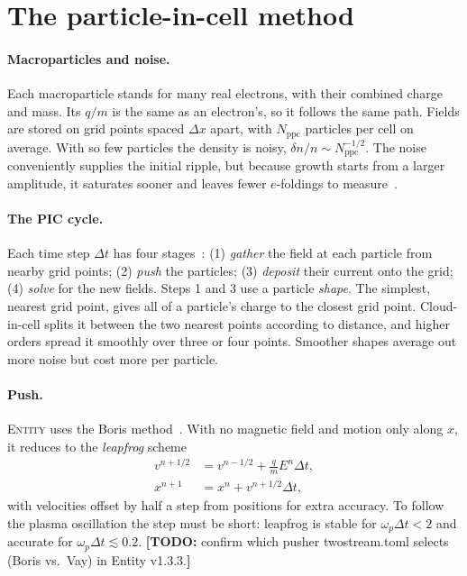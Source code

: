 \documentclass[10pt,twocolumn,letterpaper]{article}
\newcommand{\wpe}{\omega_{p}}         %
\newcommand{\ppc}{N_\mathrm{ppc}}     %
\newif\ifdraft \drafttrue
\newcommand{\todo}[1]{\ifdraft{\color{red}\textbf{[TODO:} #1\textbf{]}}\fi}
\begin{document}
\section{The particle-in-cell method}
\label{sec:pic}

\paragraph{Macroparticles and noise.}
Each macroparticle stands for many real electrons, with their combined charge and mass. Its
$q/m$ is the same as an electron's, so it follows the same path. Fields are stored on grid
points spaced $\Delta x$ apart, with $\ppc$ particles per cell on average. With so few particles
the density is noisy, $\delta n/n\sim\ppc^{-1/2}$. The noise conveniently supplies the initial
ripple, but because growth starts from a larger amplitude, it saturates sooner and leaves fewer
$e$-foldings to measure~\citep{BirdsallLangdon1991}.

\paragraph{The PIC cycle.}
Each time step $\Delta t$ has four stages~\citep{BirdsallLangdon1991,HockneyEastwood1988}:
(1) \emph{gather} the field at each particle from nearby grid points; (2) \emph{push} the
particles; (3) \emph{deposit} their current onto the grid; (4) \emph{solve} for the new fields.
Steps 1 and 3 use a particle \emph{shape}. The simplest, nearest grid point, gives all of a
particle's charge to the closest grid point. Cloud-in-cell splits it between the two nearest
points according to distance, and higher orders spread it smoothly over three or four points.
Smoother shapes average out more noise but cost more per particle.

\paragraph{Push.}
\textsc{Entity} uses the Boris method~\citep{Boris1970}. With no magnetic field and motion only
along $x$, it reduces to the \emph{leapfrog} scheme
\begin{equation}
  \begin{aligned}
    v^{n+1/2} &= v^{n-1/2} + \tfrac{q}{m}E^{n}\Delta t,\\
    x^{n+1} &= x^{n} + v^{n+1/2}\Delta t,
  \end{aligned}
\end{equation}
with velocities offset by half a step from positions for extra accuracy. To follow the plasma
oscillation the step must be short: leapfrog is stable for $\wpe\Delta t<2$ and accurate for
$\wpe\Delta t\lesssim0.2$.
\todo{confirm which pusher twostream.toml selects (Boris vs.\ Vay) in Entity v1.3.3.}
\end{document}
